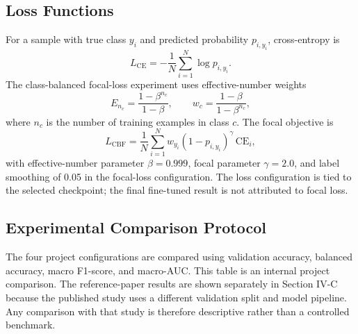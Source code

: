 \documentclass[conference]{IEEEtran}
\begin{document}
\subsection{Loss Functions}
For a sample with true class $y_i$ and predicted probability $p_{i,y_i}$, cross-entropy is
\begin{equation}
L_{\mathrm{CE}}=-\frac{1}{N}\sum_{i=1}^{N}\log p_{i,y_i}.
\end{equation}
The class-balanced focal-loss experiment uses effective-number weights
\begin{equation}
E_{n_c}=\frac{1-\beta^{n_c}}{1-\beta}, \qquad
w_c=\frac{1-\beta}{1-\beta^{n_c}},
\end{equation}
where $n_c$ is the number of training examples in class $c$. The focal objective is
\begin{equation}
L_{\mathrm{CBF}}=\frac{1}{N}\sum_{i=1}^{N}
w_{y_i}(1-p_{i,y_i})^\gamma\,\mathrm{CE}_i,
\end{equation}
with effective-number parameter $\beta=0.999$, focal parameter $\gamma=2.0$, and label smoothing of 0.05 in the focal-loss configuration. The loss configuration is tied to the selected checkpoint; the final fine-tuned result is not attributed to focal loss.

\subsection{Experimental Comparison Protocol}
The four project configurations are compared using validation accuracy, balanced accuracy, macro F1-score, and macro-AUC. This table is an internal project comparison. The reference-paper results are shown separately in Section IV-C because the published study uses a different validation split and model pipeline. Any comparison with that study is therefore descriptive rather than a controlled benchmark.
\end{document}
